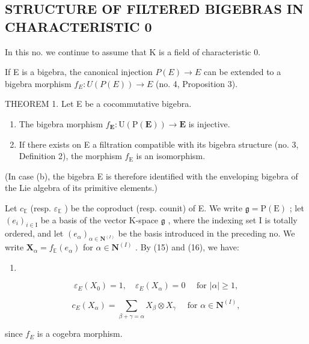 \subsection{STRUCTURE OF FILTERED BIGEBRAS IN CHARACTERISTIC 0}

In this no. we continue to assume that K is a field of characteristic 0.

If E is a bigebra, the canonical injection \(P(E) \rightarrow E\) can be extended to a bigebra morphism \(f_{E}: U(P(E)) \rightarrow E\) (no. 4, Proposition 3).

THEOREM 1. Let E be a cocommutative bigebra.

\begin{enumerate}
\def\labelenumi{(\alph{enumi})}
\item
  The bigebra morphism \(f_{\mathbf{E}} \colon \mathrm{U}(\mathrm{P}(\mathbf{E})) \to \mathbf{E}\) is injective.
\item
  If there exists on E a filtration compatible with its bigebra structure (no. 3, Definition 2), the morphism \(f_{\mathrm{E}}\) is an isomorphism.
\end{enumerate}

(In case (b), the bigebra E is therefore identified with the enveloping bigebra of the Lie algebra of its primitive elements.)

Let \(c_{\mathbb{E}}\) (resp. \(\varepsilon_{\mathbb{E}}\) ) be the coproduct (resp. counit) of E. We write \(\mathfrak{g} = \mathrm{P}(\mathrm{E})\) ; let \((e_i)_{i \in \mathrm{I}}\) be a basis of the vector K-space \(\mathfrak{g}\) , where the indexing set I is totally ordered, and let \((e_\alpha)_{\alpha \in \mathbf{N}^{(I)}}\) be the basis introduced in the preceding no. We write \(\mathbf{X}_\alpha = f_{\mathbb{E}}(e_\alpha)\) for \(\alpha \in \mathbf{N}^{(I)}\) . By (15) and (16), we have:

\begin{enumerate}
\def\labelenumi{(\arabic{enumi})}
\setcounter{enumi}{16}
\tightlist
\item
\end{enumerate}

\[
\varepsilon_ {E} (X _ {0}) = 1, \quad \varepsilon_ {E} (X _ {\alpha}) = 0 \quad \text { for } | \alpha | \geqslant 1,\tag{18}
\]

\[
c _ {E} (X _ {\alpha}) = \sum_ {\beta + \gamma = \alpha} X _ {\beta} \otimes X _ {\gamma} \quad \text { for } \alpha \in \mathbf {N} ^ {(I)},
\]

since \(f_{E}\) is a cogebra morphism.

